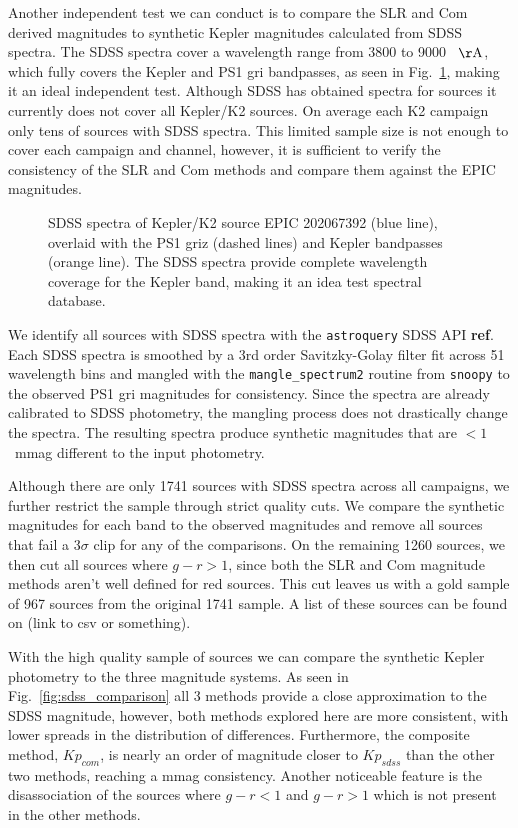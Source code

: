 \documentclass{aastex63}
\newcommand{\rr}[1]{{\bf \color{purple}{#1}}}
\begin{document}
Another independent test we can conduct is to compare the SLR and Com derived magnitudes to synthetic Kepler magnitudes calculated from SDSS spectra. The SDSS spectra cover a wavelength range from 3800 to 9000~ $\rm \AA$, which fully covers the Kepler and PS1 gri bandpasses, as seen in Fig.~\ref{fig:sdss_spec}, making it an ideal independent test. Although SDSS has obtained spectra for \rr{LARGE NUMBER} sources it currently does not cover all Kepler/K2 sources. On average each K2 campaign only tens of sources with SDSS spectra. This limited sample size is not enough to cover each campaign and channel, however, it is sufficient to verify the consistency of the SLR and Com methods and compare them against the EPIC magnitudes.

\begin{figure}
    \caption{SDSS spectra of Kepler/K2 source EPIC 202067392 (blue line), overlaid with the PS1 griz (dashed lines) and Kepler bandpasses (orange line). The SDSS spectra provide complete wavelength coverage for the Kepler band, making it an idea test spectral database.}
    \label{fig:sdss_spec}
\end{figure}

We identify all sources with SDSS spectra with the \texttt{astroquery} SDSS API \textbf{ref}. Each SDSS spectra is smoothed by a 3rd order Savitzky-Golay filter fit across 51 wavelength bins and mangled with the \texttt{mangle\_spectrum2} routine from \texttt{snoopy} to the observed PS1 gri magnitudes for consistency. Since the spectra are already calibrated to SDSS photometry, the mangling process does not drastically change the spectra. The resulting spectra produce synthetic magnitudes that are $<1$~mmag different to the input photometry. 

Although there are only 1741 sources with SDSS spectra across all campaigns, we further restrict the sample through strict quality cuts. We compare the synthetic magnitudes for each band to the observed magnitudes and remove all sources that fail a 3$\sigma$ clip for any of the comparisons. On the remaining 1260 sources, we then cut all sources where $g-r > 1$, since both the SLR and Com magnitude methods aren't well defined for red sources. This cut leaves us with a gold sample of 967 sources from the original 1741 sample. A list of these sources can be found on (link to csv or something).

With the high quality sample of sources we can compare the synthetic Kepler photometry to the three magnitude systems. As seen in Fig.~\ref{fig:sdss_comparison} all 3 methods provide a close approximation to the SDSS magnitude, however, both methods explored here are more consistent, with lower spreads in the distribution of differences. Furthermore, the composite method, $Kp_{com}$, is nearly an order of magnitude closer to $Kp_{sdss}$ than the other two methods, reaching a mmag consistency. Another noticeable feature is the disassociation of the sources where $g-r<1$ and $g-r >1$ which is not present in the other methods. 
\end{document}
